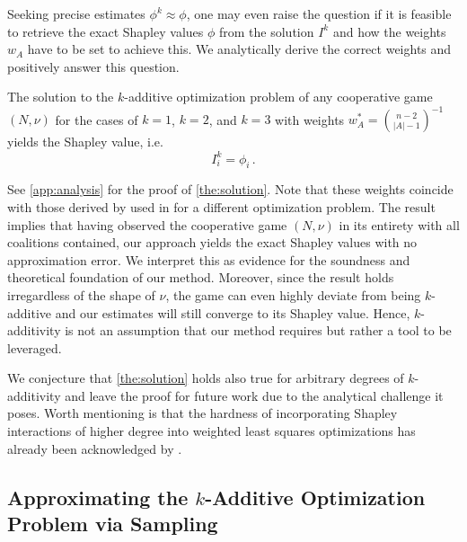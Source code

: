 Seeking precise estimates $\phi^k \approx \phi$, one may even raise the question if it is feasible to retrieve the exact Shapley values $\phi$ from the solution $I^k$ and how the weights $w_A$ have to be set to achieve this.
We analytically derive the correct weights and positively answer this question.
\begin{theorem} \label{the:solution}
    The solution to the $k$-additive optimization problem of any cooperative game $(N,\nu)$ for the cases of $k=1$, $k=2$, and $k=3$ with weights $w_A^* = \binom{n-2}{|A|-1}^{-1}$ yields the Shapley value, i.e.\
    \begin{equation*}
        I_i^k = \phi_i \, .
    \end{equation*}
\end{theorem}
See \cref{app:analysis} for the proof of \cref{the:solution}.
Note that these weights coincide with those derived by \citet{Charnes.1988} used in \citep{Lundberg.2017} for a different optimization problem.
The result implies that having observed the cooperative game $(N,\nu)$ in its entirety with all coalitions contained, our approach yields the exact Shapley values with no approximation error.
We interpret this as evidence for the soundness and theoretical foundation of our method.
Moreover, since the result holds irregardless of the shape of $\nu$, the game can even highly deviate from being $k$-additive and our estimates will still converge to its Shapley value.
Hence, $k$-additivity is not an assumption that our method requires but rather a tool to be leveraged.

We conjecture that \cref{the:solution} holds also true for arbitrary degrees of $k$-additivity and leave the proof  for future work due to the analytical challenge it poses.
Worth mentioning is that the hardness of incorporating Shapley interactions of higher degree into weighted least squares optimizations has already been acknowledged by \citet{Fumagalli.2024}.

\subsection{Approximating the $k$-Additive Optimization Problem via Sampling}
\label{subsec:sampling}

